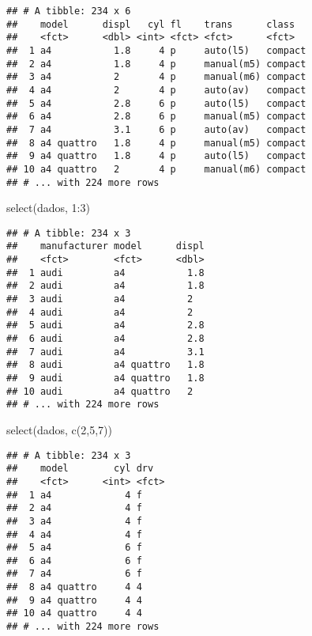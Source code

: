 \documentclass[
]{book}
\newenvironment{Shaded}{\begin{snugshade}}{\end{snugshade}}
\newcommand{\DecValTok}[1]{\textcolor[rgb]{0.00,0.00,0.81}{#1}}
\newcommand{\FunctionTok}[1]{\textcolor[rgb]{0.00,0.00,0.00}{#1}}
\newcommand{\NormalTok}[1]{#1}
\newcommand{\SpecialCharTok}[1]{\textcolor[rgb]{0.00,0.00,0.00}{#1}}
\begin{document}
\begin{verbatim}
## # A tibble: 234 x 6
##    model      displ   cyl fl    trans      class  
##    <fct>      <dbl> <int> <fct> <fct>      <fct>  
##  1 a4           1.8     4 p     auto(l5)   compact
##  2 a4           1.8     4 p     manual(m5) compact
##  3 a4           2       4 p     manual(m6) compact
##  4 a4           2       4 p     auto(av)   compact
##  5 a4           2.8     6 p     auto(l5)   compact
##  6 a4           2.8     6 p     manual(m5) compact
##  7 a4           3.1     6 p     auto(av)   compact
##  8 a4 quattro   1.8     4 p     manual(m5) compact
##  9 a4 quattro   1.8     4 p     auto(l5)   compact
## 10 a4 quattro   2       4 p     manual(m6) compact
## # ... with 224 more rows
\end{verbatim}

\begin{Shaded}
\begin{Highlighting}[]
\FunctionTok{select}\NormalTok{(dados, }\DecValTok{1}\SpecialCharTok{:}\DecValTok{3}\NormalTok{)      }
\end{Highlighting}
\end{Shaded}

\begin{verbatim}
## # A tibble: 234 x 3
##    manufacturer model      displ
##    <fct>        <fct>      <dbl>
##  1 audi         a4           1.8
##  2 audi         a4           1.8
##  3 audi         a4           2  
##  4 audi         a4           2  
##  5 audi         a4           2.8
##  6 audi         a4           2.8
##  7 audi         a4           3.1
##  8 audi         a4 quattro   1.8
##  9 audi         a4 quattro   1.8
## 10 audi         a4 quattro   2  
## # ... with 224 more rows
\end{verbatim}

\begin{Shaded}
\begin{Highlighting}[]
\FunctionTok{select}\NormalTok{(dados, }\FunctionTok{c}\NormalTok{(}\DecValTok{2}\NormalTok{,}\DecValTok{5}\NormalTok{,}\DecValTok{7}\NormalTok{)) }
\end{Highlighting}
\end{Shaded}

\begin{verbatim}
## # A tibble: 234 x 3
##    model        cyl drv  
##    <fct>      <int> <fct>
##  1 a4             4 f    
##  2 a4             4 f    
##  3 a4             4 f    
##  4 a4             4 f    
##  5 a4             6 f    
##  6 a4             6 f    
##  7 a4             6 f    
##  8 a4 quattro     4 4    
##  9 a4 quattro     4 4    
## 10 a4 quattro     4 4    
## # ... with 224 more rows
\end{verbatim}
\end{document}
